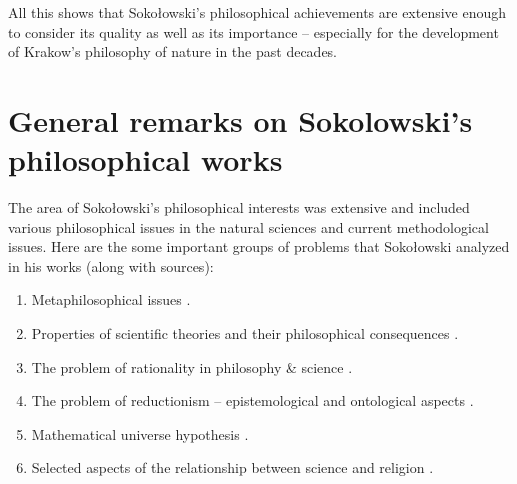 \documentclass[%
  manuscript=article,
  year=2024,
  volume=77,
  doi=00000.000,
]{zfn}
\begin{document}
All this shows that Sokołowski's philosophical achievements are extensive enough to consider its quality as well as its importance -- especially for the development of Krakow's philosophy of nature in the past decades.



\section{General remarks on Sokolowski's philosophical works }

The area of Sokołowski's philosophical interests was extensive and included various philosophical issues in the natural sciences and current methodological issues. Here are the some important groups of problems that Sokołowski analyzed in his works (along with sources):



\begin{enumerate}

\item Metaphilosophical issues 
\parencites[numerous remarks in:][]{}[][]{}[][]{}[][]{}[][]{}.%


\item Properties of scientific theories and their philosophical consequences 
\parencites[][]{}[][]{}[][]{}[][]{}[][]{}[][]{}[][]{}[][]{}[][]{}[][]{}[][]{}[][]{}[][]{}.%


\item The problem of rationality in philosophy \& science 
\parencites[][]{}[][]{}.%


\item The problem of reductionism -- epistemological and ontological aspects 
\parencites[][]{}[][]{}[][]{}.%


\item Mathematical universe hypothesis 
\parencites[][]{}[][]{}[][]{}[][]{}.%


\item Selected aspects of the relationship between science and religion 
\parencites[][]{}[][]{}[][]{}[][]{}[][]{}.%


\end{enumerate}
\end{document}
